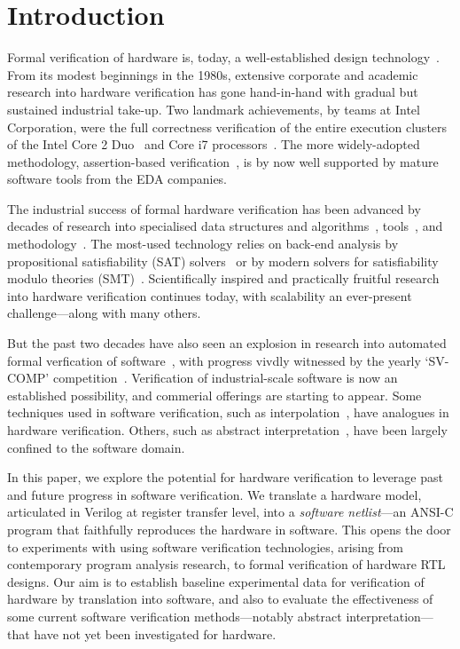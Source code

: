 \section{Introduction}\label{sec:intro}
%
Formal verification of hardware is, today, a well-established design technology~\cite{Seligman:2015:FV}. From its modest beginnings in the 1980s, extensive corporate and academic research into hardware verification has gone hand-in-hand with gradual but sustained industrial take-up. Two landmark achievements, by teams at Intel Corporation, were the full correctness verification of the entire execution clusters of the Intel Core 2 Duo~\cite{Core2} and Core i7 processors~\cite{i7}. The more widely-adopted methodology,
assertion-based verification~\cite{Foster:2009:AAB}, is by now well supported by mature software tools from the EDA companies.

The industrial success of formal hardware verification has been advanced by decades of research into specialised data structures and algorithms~\cite{vis}, tools~\cite{Seger:2005:IEE,abc}, and methodology~\cite{MCMILLAN2000279,Aagaard:2000:MLH}. The most-used technology relies on back-end analysis by propositional satisfiability (SAT) solvers~\cite{Biere1999} or by modern solvers for satisfiability modulo theories (SMT)~\cite{decision_procedures, DBLP:conf/lpar/AndrausLS08,soc-keating,
DBLP:conf/mtv/SunkariCVM07,DBLP:conf/cav/Bjesse08}. Scientifically inspired and practically fruitful research into hardware verification continues today, with scalability an ever-present challenge---along with many others. 

But the past two decades have also seen an explosion in research into automated formal verfication of software~\cite{dkw2008}, with progress vivdly witnessed by the yearly `SV-COMP' competition~\cite{Beyer2017}.  Verification of industrial-scale software is now an established possibility, and commerial offerings are starting to appear. Some techniques used in software verification, such as interpolation~\cite{}, have analogues in hardware verification. Others, such as abstract interpretation~\cite{}, have been largely confined to the software domain.  

In this paper, we explore the potential for hardware verification to leverage past and future progress in software verification. We translate a hardware model, articulated in Verilog at register transfer level, into 
a \emph{software netlist}---an ANSI-C program that faithfully reproduces the hardware in software. This opens the door to experiments with using software verification technologies, arising from contemporary program analysis research, to formal verification of hardware RTL designs. Our aim is to establish baseline experimental data for verification of hardware by translation into software, and also to evaluate the effectiveness of some current software verification methods---notably abstract interpretation---that have not yet been investigated for hardware.


